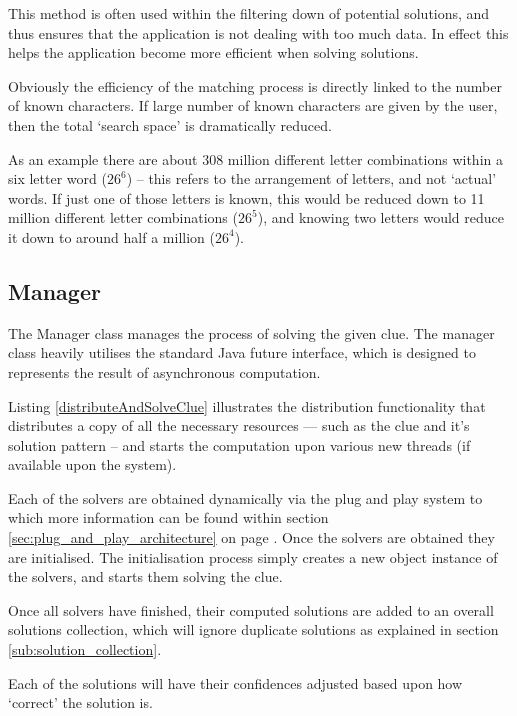 This method is often used within the filtering down of potential solutions, and
thus ensures that the application is not dealing with too much data. In effect
this helps the application become more efficient when solving solutions. 

Obviously the efficiency of the matching process is directly linked to the 
number of known characters. If large number of known characters are given by the
user, then the total `search space' is dramatically reduced.

As an example there are about 308 million different letter combinations within a
six letter word ($26^6$) -- this refers to the arrangement of letters, and not 
`actual' words. If just one of those letters is known, this would be reduced 
down to 11 million different letter combinations ($26^5$), and knowing two 
letters would reduce it down to around half a million ($26^4$).


\subsection{Manager}
\label{sub:clue}

The Manager class manages the process of solving the given clue. The manager 
class heavily utilises the standard Java future interface, which is designed to
represents the result of asynchronous computation.

Listing \ref{distributeAndSolveClue} illustrates the distribution functionality 
that distributes a copy of all the necessary resources --- such as the clue 
and it's solution pattern -- and starts the computation upon various new 
threads (if available upon the system).

Each of the solvers are obtained dynamically via the plug and play system to 
which more information can be found within section 
\ref{sec:plug_and_play_architecture} on page \pageref{sec:plug_and_play_architecture}.
Once the solvers are obtained they are initialised. The initialisation process
simply creates a new object instance of the solvers, and starts them solving the
clue.

Once all solvers have finished, their computed solutions are added to an overall
solutions collection, which will ignore duplicate solutions as explained in 
section \ref{sub:solution_collection}.

Each of the solutions will have their confidences adjusted based upon how 
`correct' the solution is.

